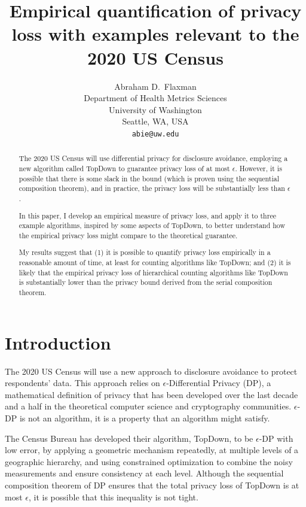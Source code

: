 \documentclass{article}
\title{Empirical quantification of privacy loss with examples relevant to the 2020 US Census}
\author{%
  Abraham D.~Flaxman \\
  Department of Health Metrics Sciences\\
  University of Washington\\
  Seattle, WA, USA \\
  \texttt{abie@uw.edu} \\
}
\begin{document}
\maketitle

\begin{abstract}
  The 2020 US Census will use differential privacy for disclosure avoidance, employing a new algorithm called TopDown to guarantee privacy loss of at most $\epsilon$.  However, it is possible that there is some slack in the bound (which is proven using the sequential composition theorem), and in practice, the privacy loss will be substantially less than $\epsilon$.
  
  In this paper, I develop an empirical measure of privacy loss, and apply it to three  example algorithms, inspired by some aspects of TopDown, to better understand how the empirical privacy loss might compare to the theoretical guarantee.
  
  My results suggest that (1) it is possible to quantify privacy loss empirically in a reasonable amount of time, at least for counting algorithms like TopDown; and (2) it is likely that the empirical privacy loss of hierarchical counting algorithms like TopDown is substantially lower than the privacy bound derived from the serial composition theorem.
\end{abstract}

\section{Introduction}

The 2020 US Census will use a new approach to disclosure avoidance to protect respondents' data.\cite{abowd2018disclosure} This approach relies on $\epsilon$-Differential Privacy (DP), a mathematical definition of privacy that has been developed over the last decade and a half in the theoretical computer science and cryptography communities. $\epsilon$-DP is not an algorithm, it is a property that an algorithm might satisfy.\cite{dwork2014algorithmic}

The Census Bureau has developed their algorithm, TopDown, to be $\epsilon$-DP with low error, by applying a geometric mechanism repeatedly, at multiple levels of a geographic hierarchy, and using constrained optimization to combine the noisy measurements and ensure consistency at each level.\cite{abowd2019census}  Although the sequential composition theorem of DP ensures that the total privacy loss of TopDown is at most $\epsilon$, it is possible that this inequality is not tight.
\end{document}

